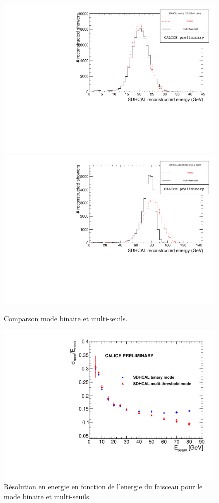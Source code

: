 \begin{figure}[!h]
  \begin{center}
    \includegraphics[width=.45\textwidth]{SDHCAL/figs/Pi20GeV_SDHCAL_2modes_overlay.pdf}
    \includegraphics[width=.45\textwidth]{SDHCAL/figs/Pi80GeV_SDHCAL_2modes_overlay.pdf}
    \caption{Comparson mode binaire et multi-seuils.}
    \label{fig:multi_vs_binary}
  \end{center}
\end{figure}

\begin{figure}[!h]
  \begin{center}
    \includegraphics[width=.55\textwidth]{SDHCAL/figs/RESOLUTION.pdf}
    \caption{Résolution en energie en fonction de l'energie du faisceau pour le mode binaire et multi-seuils.}
    \label{fig:multi_vs_binary}
  \end{center}
\end{figure}
